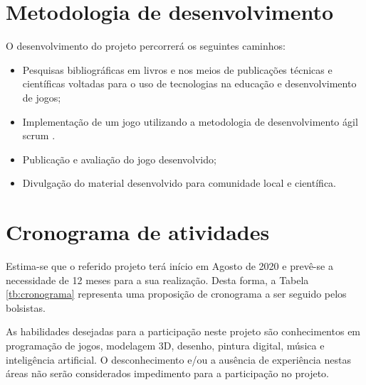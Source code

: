 \documentclass[article,12pt,openany,oneside,a4paper,english,brazil]{abntex2}
\begin{document}
\section{Metodologia de desenvolvimento}
\label{sc:met}

O desenvolvimento do projeto percorrerá os seguintes caminhos: 

\begin{itemize}
  \item Pesquisas bibliográficas em livros e nos meios de publicações técnicas e científicas voltadas para o uso de tecnologias na educação e desenvolvimento de jogos;
    
   \item Implementação de um jogo utilizando a metodologia de desenvolvimento ágil scrum \cite{Keith2010}.
   
   \item Publicação e avaliação do jogo desenvolvido;
   
   \item Divulgação do material desenvolvido para comunidade local e científica.
\end{itemize}

\section{Cronograma de atividades}
\label{sc:cronograma}

Estima-se que o referido projeto terá início em Agosto de 2020 e prevê-se a necessidade de 12 meses para a sua realização. Desta forma, a Tabela \ref{tb:cronograma} representa uma proposição de cronograma a ser seguido pelos bolsistas.

As habilidades desejadas para a participação neste projeto são conhecimentos em programação de jogos, modelagem 3D, desenho, pintura digital, música e inteligência artificial. O desconhecimento e/ou a ausência de experiência nestas áreas não serão considerados impedimento para a participação no projeto.
\end{document}
